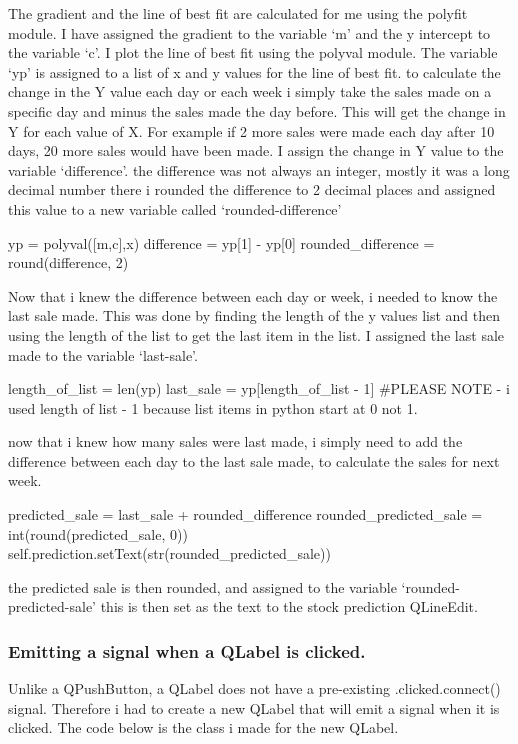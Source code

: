 The gradient and the line of best fit are calculated for me using the polyfit module. I have assigned the gradient to the variable `m' and the y intercept to the variable `c'. I plot the line of best fit using the polyval module. The variable `yp' is assigned to a list of x and y values for the line of best fit. to calculate the change in the Y value each day or each week i simply take the sales made on a specific day and minus the sales made the day before. This will get the change in Y for each value of X. For example if 2 more sales were made each day after 10 days, 20 more sales would have been made. I assign the change in Y value to the variable `difference'. the difference was not always an integer, mostly it was a long decimal number there i rounded the difference to 2 decimal places and assigned this value to a new variable called `rounded-difference'

\begin{python}
yp = polyval([m,c],x)
difference = yp[1] - yp[0]
rounded_difference = round(difference, 2)
\end{python}

Now that i knew the difference between each day or week, i needed to know the last sale made. This was done by finding the length of the y values list and then using the length of the list to get the last item in the list. I assigned the last sale made to the variable `last-sale'.

\begin{python}
length_of_list = len(yp)
last_sale = yp[length_of_list - 1]
#PLEASE NOTE - i used length of list - 1 because list items in python start at 0 not 1.
\end{python}

now that i knew how many sales were last made, i simply need to add the difference between each day to the last sale made, to calculate the sales for next week.

\begin{python}
predicted_sale = last_sale + rounded_difference
rounded_predicted_sale = int(round(predicted_sale, 0))
self.prediction.setText(str(rounded_predicted_sale))
\end{python}

the predicted sale is then rounded, and assigned to the variable `rounded-predicted-sale' this is then set as the text to the stock prediction QLineEdit.

\pagebreak

\subsubsection{Emitting a signal when a QLabel is clicked.}
\label{fig:custom-label}
Unlike a QPushButton, a QLabel does not have a pre-existing .clicked.connect() signal. Therefore i had to create a new QLabel that will emit a signal when it is clicked. The code below is the class i made for the new QLabel.

